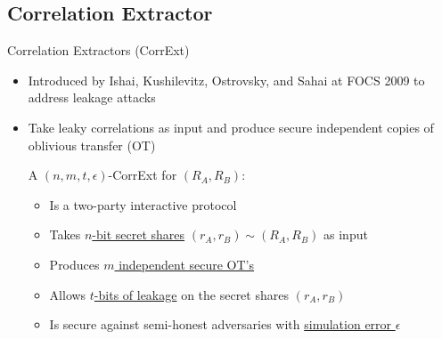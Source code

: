 \subsection{Correlation Extractor}
\begin{frame}{Correlation Extractors (CorrExt)}
	\begin{itemize}
		\item Introduced by Ishai, Kushilevitz, Ostrovsky, and Sahai at FOCS 2009 \cite{FOCS:IKOS09} to address leakage attacks 
		\item Take leaky correlations as input and produce secure independent
		copies of oblivious transfer (OT)
		\pause
		\begin{definition}
			A $ (n,m,t,\epsilon) $-CorrExt for $ (R_A, R_B) $: 
			\begin{itemize}
				\item Is a two-party interactive protocol	
				\item Takes \underline{$n$-bit secret shares} $ (r_A, r_B) \sim (R_A, R_B) $ as input
				\item Produces \underline{$ m $ independent secure OT's}
				\item Allows \underline{$ t $-bits of leakage} on the secret shares $ (r_A, r_B) $
				\item Is secure against semi-honest adversaries with \underline{simulation error $ \epsilon $}
			\end{itemize}
		\end{definition}
	\end{itemize}
\end{frame}
	

